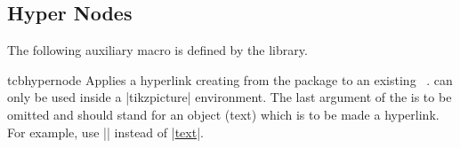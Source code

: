 \subsection{Hyper Nodes}
The following auxiliary macro is defined by the  library.
\enlargethispage*{1cm}

\begin{docCommand}[doc new and updated={2016-02-03}{2023-02-28}]{tcbhypernode}{}
  Applies a hyperlink creating  from the package  \cite{rahtz:hyperref}
  to an existing \tikzname\ .  can only
  be used inside a |tikzpicture| environment.
  The last argument of the  is to be omitted and should stand
  for an object (text) which is to be made a hyperlink.
  For example, use  |\hyperref[name]| instead of |\hyperref[name]{text}|.

\begin{dispExample}
\end{dispExample}

\end{docCommand}

